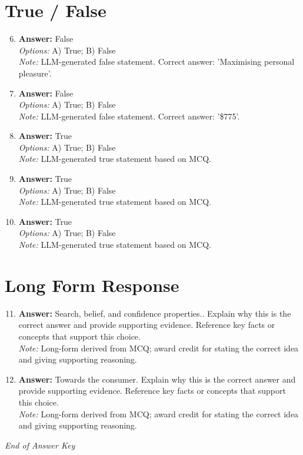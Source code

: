 \documentclass[12pt]{article}
\begin{document}
\section*{True / False}
\begin{enumerate}[label=\arabic*.]
\setcounter{enumi}{5}
\item \textbf{Answer:} False
\\ \textit{Options:} A) True; B) False
\\ \textit{Note:} LLM-generated false statement. Correct answer: 'Maximising personal pleasure'.
\item \textbf{Answer:} False
\\ \textit{Options:} A) True; B) False
\\ \textit{Note:} LLM-generated false statement. Correct answer: '\$775'.
\item \textbf{Answer:} True
\\ \textit{Options:} A) True; B) False
\\ \textit{Note:} LLM-generated true statement based on MCQ.
\item \textbf{Answer:} True
\\ \textit{Options:} A) True; B) False
\\ \textit{Note:} LLM-generated true statement based on MCQ.
\item \textbf{Answer:} True
\\ \textit{Options:} A) True; B) False
\\ \textit{Note:} LLM-generated true statement based on MCQ.
\end{enumerate}

\section*{Long Form Response}
\begin{enumerate}[label=\arabic*.]
\setcounter{enumi}{10}
\item \textbf{Answer:} Search, belief, and confidence properties.. Explain why this is the correct answer and provide supporting evidence. Reference key facts or concepts that support this choice.
\\ \textit{Note:} Long-form derived from MCQ; award credit for stating the correct idea and giving supporting reasoning.
\item \textbf{Answer:} Towards the consumer. Explain why this is the correct answer and provide supporting evidence. Reference key facts or concepts that support this choice.
\\ \textit{Note:} Long-form derived from MCQ; award credit for stating the correct idea and giving supporting reasoning.
\end{enumerate}

\vfill
\noindent\textit{End of Answer Key}
\end{document}
